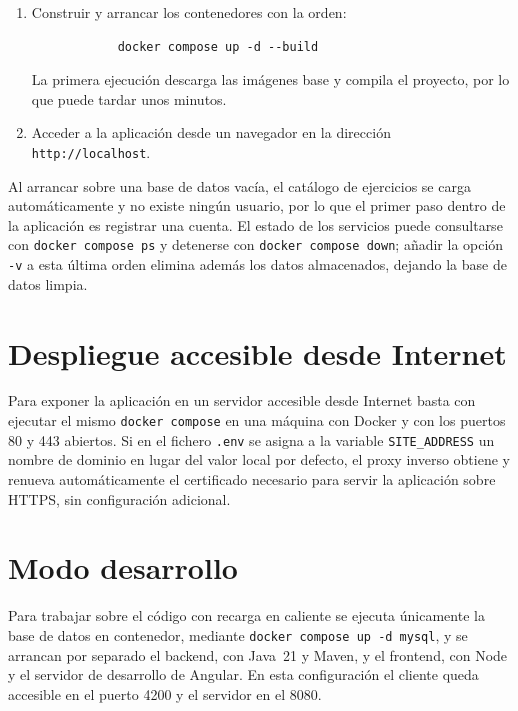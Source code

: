 \documentclass[12pt,a4paper,twoside,openright]{book}
\begin{document}
\begin{umaappendices}
\begin{enumerate}
            \item Construir y arrancar los contenedores con la orden:
            \begin{verbatim}
            docker compose up -d --build
            \end{verbatim}
            La primera ejecución descarga las imágenes base y compila el proyecto,
            por lo que puede tardar unos minutos.
    
            \item Acceder a la aplicación desde un navegador en la dirección
            \texttt{http://localhost}.
        \end{enumerate}
    
        Al arrancar sobre una base de datos vacía, el catálogo de ejercicios se
        carga automáticamente y no existe ningún usuario, por lo que el primer paso
        dentro de la aplicación es registrar una cuenta. El estado de los servicios
        puede consultarse con \texttt{docker compose ps} y detenerse con
        \texttt{docker compose down}; añadir la opción \texttt{-v} a esta última
        orden elimina además los datos almacenados, dejando la base de datos limpia.
    
        \section*{Despliegue accesible desde Internet}
    
        Para exponer la aplicación en un servidor accesible desde Internet basta con
        ejecutar el mismo \texttt{docker compose} en una máquina con Docker y con los
        puertos 80 y 443 abiertos. Si en el fichero \texttt{.env} se asigna a la
        variable \texttt{SITE\_ADDRESS} un nombre de dominio en lugar del valor local
        por defecto, el proxy inverso obtiene y renueva automáticamente el
        certificado necesario para servir la aplicación sobre HTTPS, sin
        configuración adicional.
    
        \section*{Modo desarrollo}
    
        Para trabajar sobre el código con recarga en caliente se ejecuta únicamente
        la base de datos en contenedor, mediante \texttt{docker compose up -d mysql},
        y se arrancan por separado el backend, con Java~21 y Maven, y el frontend,
        con Node y el servidor de desarrollo de Angular. En esta configuración el
        cliente queda accesible en el puerto 4200 y el servidor en el 8080.


\end{umaappendices}
\end{document}
